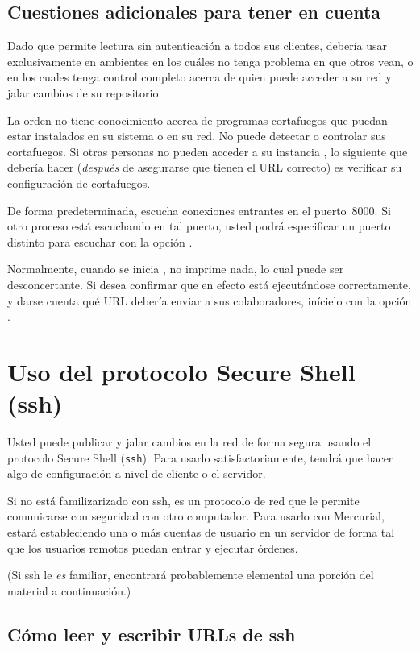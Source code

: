 \subsection{Cuestiones adicionales para tener en cuenta}

Dado que permite lectura sin autenticación a todos sus clientes,
debería usar  exclusivamente en ambientes en los cuáles
no tenga problema en que otros vean, o en los cuales tenga control
completo acerca de quien puede acceder a su red y jalar cambios de su
repositorio.

La orden  no tiene conocimiento acerca de programas
cortafuegos que puedan estar instalados en su sistema o en su red. No
puede detectar o controlar sus cortafuegos.  Si otras personas no
pueden acceder a su instancia , lo siguiente que debería hacer
(\emph{después} de asegurarse que tienen el URL correcto) es verificar
su configuración de cortafuegos.

De forma predeterminada,  escucha conexiones entrantes en
el puerto~8000.  Si otro proceso está escuchando en tal puerto, usted
podrá especificar un puerto distinto para escuchar con la opción
.

Normalmente, cuando se inicia , no imprime nada, lo cual
puede ser desconcertante.  Si desea confirmar que en efecto está
ejecutándose correctamente, y darse cuenta qué URL debería enviar a
sus colaboradores, inícielo con la opción .

\section{Uso del protocolo Secure Shell (ssh)}
\label{sec:collab:ssh}

Usted puede publicar y jalar cambios en la red de forma segura usando
el protocolo Secure Shell (\texttt{ssh}).  Para usarlo satisfactoriamente,
tendrá que hacer algo de configuración a nivel de cliente o el
servidor.

Si no está familizarizado con ssh, es un protocolo de red que le permite
comunicarse con seguridad con otro computador.  Para usarlo con
Mercurial, estará estableciendo una o más cuentas de usuario en un
servidor de forma tal que los usuarios remotos puedan entrar y
ejecutar órdenes.

(Si ssh le \emph{es} familiar, encontrará probablemente elemental una
porción del material a continuación.)

\subsection{Cómo leer y escribir URLs de ssh}

